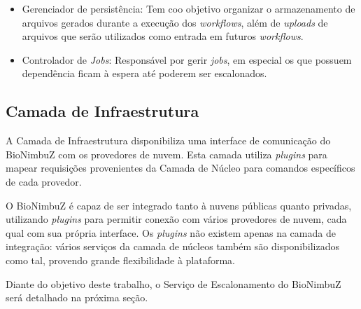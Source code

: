 \begin{itemize}
		\item Gerenciador de persistência: Tem coo objetivo organizar o armazenamento de arquivos gerados durante a execução dos \textit{workflows}, além de \textit{uploads} de arquivos que serão utilizados como entrada em futuros \textit{workflows}.
		\item Controlador de \textit{Jobs}: Responsável por gerir \textit{jobs}, em especial os que possuem dependência ficam à espera até poderem ser escalonados.
	
	\end{itemize}
	
	\subsection{Camada de Infraestrutura} A Camada de Infraestrutura disponibiliza uma interface de comunicação do BioNimbuZ com os provedores de nuvem. Esta camada utiliza \textit{plugins} para mapear requisições provenientes da Camada de Núcleo para comandos específicos de cada provedor.

O BioNimbuZ é capaz de ser integrado tanto à nuvens públicas quanto privadas, utilizando \textit{plugins} para permitir conexão com vários provedores de nuvem, cada qual com sua própria interface. Os \textit{plugins} não existem apenas na camada de integração: vários serviços da camada de núcleos também são disponibilizados como tal, provendo grande flexibilidade à plataforma.

Diante do objetivo deste trabalho, o Serviço de Escalonamento do BioNimbuZ será detalhado na próxima seção.

